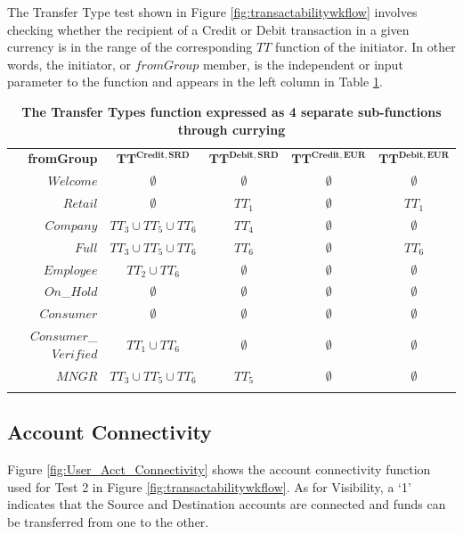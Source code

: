 The Transfer Type test shown in Figure \ref{fig:transactabilitywkflow} involves checking whether the recipient of a Credit or Debit transaction in a given currency is in the range of the corresponding $TT$ function of the initiator. In other words, the initiator, or $fromGroup$ member, is the independent or input parameter to the function and appears in the left column in Table \ref{tab:TTs}.

\setlength{\tabcolsep}{10pt}
\setlength\extrarowheight{3pt}
\begin{table}[H]
\begin{centering}
\small
{
\begin{tabular}{ r | c | c | c | c }
\hline
\textbf{fromGroup}	& $\bm{TT}^{\bm{Credit,SRD}}$ & $\bm{TT}^{\bm{Debit,SRD}}$ 
				& $\bm{TT}^{\bm{Credit,EUR}}$ & $\bm{TT}^{\bm{Debit,EUR}}$\\
\Xhline{1.5pt}
$Welcome$	& $\emptyset$ 				& $\emptyset$	& $\emptyset$	& $\emptyset$	 \\[3pt]
\hline
$Retail$		& $\emptyset$				& $TT_1$ 		& $\emptyset$	& $TT_1$	 \\[3pt]
\hline
$Company$	& $TT_3 \cup TT_5 \cup TT_6$ & $TT_4$		& $\emptyset$	& $\emptyset$	 \\[3pt]
\hline
$Full$		& $TT_3 \cup TT_5 \cup TT_6$ & $TT_6$		& $\emptyset$	& $TT_6$	 \\[3pt]
\hline
$Employee$	& $TT_2 \cup TT_6$ 		& $\emptyset$	&$\emptyset$ 	& $\emptyset$	 \\[3pt]
\hline
$On$\_$Hold$	& $\emptyset$				& $\emptyset$	& $\emptyset$	& $\emptyset$	 \\[3pt]
\hline
$Consumer$	& $\emptyset$				& $\emptyset$	& $\emptyset$	&$\emptyset$ 	 \\[3pt]
\hline
$Consumer$\_$Verified$ & $TT_1 \cup TT_6$ 	& $\emptyset$	& $\emptyset$ 	& $\emptyset$	 \\[3pt]
\hline
$MNGR$ 		& $TT_3 \cup TT_5 \cup TT_6$ & $TT_5$ & $\emptyset$ & $\emptyset$	 \\[3pt]
\Xhline{1.5pt}
\end{tabular}
}
\caption{\small\textbf{The Transfer Types function expressed as 4 separate sub-functions through currying}}
\label{tab:TTs}
\end{centering}
\vspace{-0.5cm}
\end{table}



\subsection{Account Connectivity}
Figure \ref{fig:User_Acct_Connectivity} shows the account connectivity function used for Test 2 in Figure \ref{fig:transactabilitywkflow}. As for Visibility, a `1' indicates that the Source and Destination accounts are connected and funds can be transferred from one to the other.

